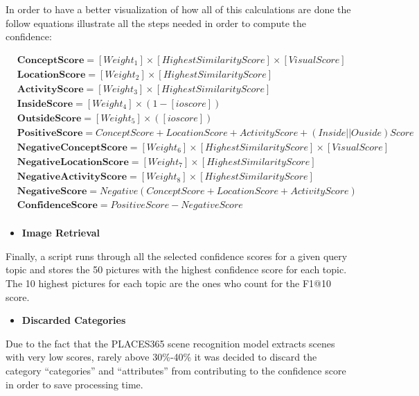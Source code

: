    


    In order to have a better visualization of how all of this calculations are done the follow equations illustrate all the steps needed in order to compute the confidence:

    \begin{align*}
        &\textbf{ConceptScore}  =   [Weight_1]\times[HighestSimilarityScore]\times[VisualScore] \\ 
        &\textbf{LocationScore} = [Weight_2]\times[HighestSimilarityScore] \\ 
      &\textbf{ActivityScore} =  [Weight_3]\times[HighestSimilarityScore]\\
        &\textbf{InsideScore}   =  [Weight_4]\times(1-[ioscore])\\
        &\textbf{OutsideScore}  =  [Weight_5]\times([ioscore])\\
        &\textbf{PositiveScore}  =  ConceptScore + LocationScore + ActivityScore + (Inside||Ouside)Score\\
        &\textbf{NegativeConceptScore}  =  [Weight_6]\times[HighestSimilarityScore]\times[VisualScore]\\
        &\textbf{NegativeLocationScore}  =  [Weight_7]\times[HighestSimilarityScore]\\
        &\textbf{NegativeActivityScore}  =  [Weight_8]\times[HighestSimilarityScore]\\
        &\textbf{NegativeScore}  =  Negative(ConceptScore + LocationScore + ActivityScore) \\
        &\textbf{ConfidenceScore}  =  PositiveScore - NegativeScore\\
  \end{align*}
  

  \begin{itemize}
    \item \textbf{Image Retrieval}
  \end{itemize}

    Finally, a script runs through all the selected confidence scores for a given
    query topic and stores the 50 pictures with the highest confidence score for each topic. The 10 highest pictures for each topic are the ones who count for the F1@10 score.
       
    \begin{itemize}
      \item \textbf{Discarded Categories}
    \end{itemize}
    
    Due to the fact that the PLACES365 scene recognition model extracts scenes with very low scores, rarely above 30\%-40\% it was decided to discard the category \enquote{categories} and \enquote{attributes} from contributing to the confidence score in order to save processing time.

